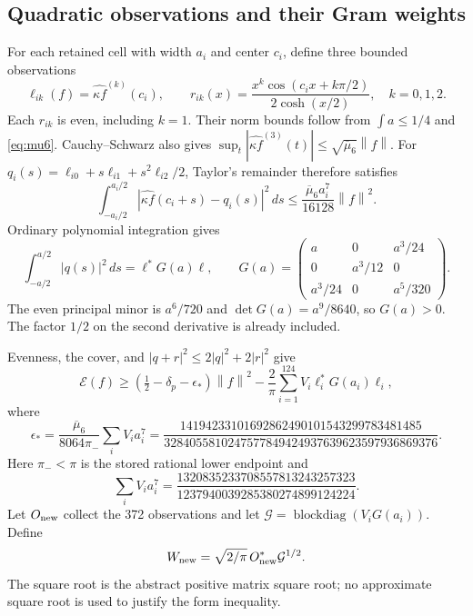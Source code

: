 \documentclass[11pt,a4paper]{article}
\numberwithin{equation}{section}
\theoremstyle{definition}\newtheorem{definition}[theorem]{Definition}
\theoremstyle{remark}\newtheorem{remark}[theorem]{Remark}
\newcommand{\EE}{\mathcal E}
\newcommand{\norm}[1]{\left\|#1\right\|}
\begin{document}
\subsection{Quadratic observations and their Gram weights}
For each retained cell with width $a_i$ and center $c_i$, define three bounded observations
\begin{equation}\label{eq:newobs}
 \ell_{ik}(f)=\widehat{\kappa f}^{(k)}(c_i),\qquad
 r_{ik}(x)=\frac{x^k\cos(c_ix+k\pi/2)}{2\cosh(x/2)},
 \quad k=0,1,2.
\end{equation}
Each $r_{ik}$ is even, including $k=1$. Their norm bounds follow from $\int a\le1/4$ and \eqref{eq:mu6}. Cauchy--Schwarz also gives
$\sup_t|\widehat{\kappa f}^{(3)}(t)|\le\sqrt{\overline\mu_6}\norm f$.
For
$q_i(s)=\ell_{i0}+s\ell_{i1}+s^2\ell_{i2}/2$,
Taylor's remainder therefore satisfies
\begin{equation}\label{eq:newremainder}
 \int_{-a_i/2}^{a_i/2}|\widehat{\kappa f}(c_i+s)-q_i(s)|^2\,ds
 \le\frac{\overline\mu_6a_i^7}{16128}\norm f^2.
\end{equation}
Ordinary polynomial integration gives
\begin{equation}\label{eq:Gblock}
 \int_{-a/2}^{a/2}|q(s)|^2\,ds=\ell^*G(a)\ell,
 \qquad G(a)=\begin{pmatrix}a&0&a^3/24\\0&a^3/12&0\\a^3/24&0&a^5/320\end{pmatrix}.
\end{equation}
The even principal minor is $a^6/720$ and $\det G(a)=a^9/8640$, so $G(a)>0$. The factor $1/2$ on the second derivative is already included.

Evenness, the cover, and $|q+r|^2\le2|q|^2+2|r|^2$ give
\begin{equation}\label{eq:newenergy}
 \EE(f)\ge(\tfrac12-\delta_p-\epsilon_*)\norm f^2
 -\frac2\pi\sum_{i=1}^{124}V_i\ell_i^*G(a_i)\ell_i,
\end{equation}
where
\begin{equation}\label{eq:epsstar}
 \epsilon_*=
 \frac{\overline\mu_6}{8064\pi_-}\sum_iV_ia_i^7
 =\frac{14194233101692862490101543299783481485}
 {3284055810247577849424937639623597936869376}.
\end{equation}
Here $\pi_-<\pi$ is the stored rational lower endpoint and
\begin{equation}
 \sum_iV_ia_i^7=
 \frac{1320835233708557813243257323}{1237940039285380274899124224}.
\end{equation}
Let $O_{\rm new}$ collect the 372 observations and let
$\mathcal G=\operatorname{blockdiag}(V_iG(a_i))$. Define
\begin{equation}
 W_{\rm new}=\sqrt{2/\pi}\,O_{\rm new}^*\mathcal G^{1/2}.
\end{equation}
The square root is the abstract positive matrix square root; no approximate square root is used to justify the form inequality.
\end{document}
